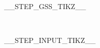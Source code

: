 \begin{minipage}{0.5\textwidth}
__STEP_GSS_TIKZ__

\begin{center}
\end{center}

\end{minipage}
~
\begin{minipage}{0.48\textwidth}
\begin{center}__STEP_INPUT_TIKZ__\end{center}
\begin{center}
\end{center}

\end{minipage}
